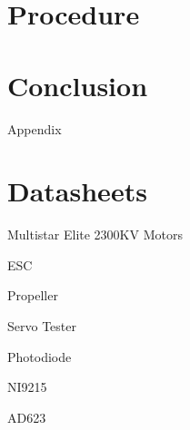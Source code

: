 \documentclass{article}
\begin{document}
\section{Procedure}

 
\section{Conclusion}

\newpage
\thispagestyle{empty}  %
\begin{center}
	\vspace*{\fill}
	{\Huge Appendix}
	\vspace*{\fill}
\end{center}

\newpage
\begin{appendices}
\pagestyle{fancy}
\renewcommand{\thefigure}{A\arabic{figure}}
\setcounter{figure}{0}

\pagebreak

\hypertarget{datasheets}{}
\section{Datasheets}
\begin{enumerate}[label = {[\arabic*]}]
\small
\item \hypertarget{1}{Multistar Elite 2300KV Motors}
\item ESC
\item Propeller
\item Servo Tester
\item Photodiode
\item NI9215
\item AD623


\end{enumerate}

\end{appendices}
\end{document}
